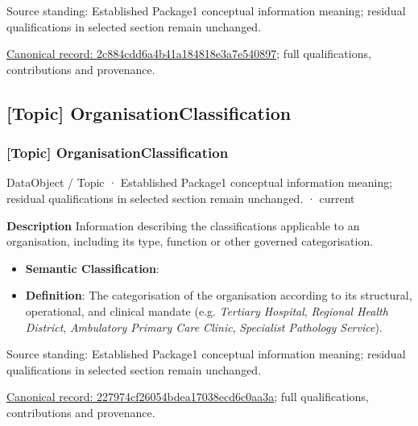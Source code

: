 Source standing: Established Package1 conceptual information meaning; residual qualifications in selected section remain unchanged.


{\footnotesize \href{../../../../continuum/application/data-object/topic/2c884cdd6a4b41a184818e3a7e540897.md}{Canonical record: 2c884cdd6a4b41a184818e3a7e540897}; full qualifications, contributions and provenance.}\par
\subsection{[Topic] OrganisationClassification}

\subsubsection{[Topic] OrganisationClassification}

\label{element:227974cf26054bdea17038ecd6c0aa3a}
{\small DataObject / Topic · Established Package1 conceptual information meaning; residual qualifications in selected section remain unchanged. · current}\par

\textbf{Description}
Information describing the classifications applicable to an organisation, including its type, function or other governed categorisation.



\begin{itemize}


\item \textbf{Semantic Classification}: \texttt{}

\item \textbf{Definition}: The categorisation of the organisation according to its structural, operational, and clinical mandate (e.g. \emph{Tertiary Hospital}, \emph{Regional Health District}, \emph{Ambulatory Primary Care Clinic}, \emph{Specialist Pathology Service}).

\end{itemize}


Source standing: Established Package1 conceptual information meaning; residual qualifications in selected section remain unchanged.


{\footnotesize \href{../../../../continuum/application/data-object/topic/227974cf26054bdea17038ecd6c0aa3a.md}{Canonical record: 227974cf26054bdea17038ecd6c0aa3a}; full qualifications, contributions and provenance.}\par
